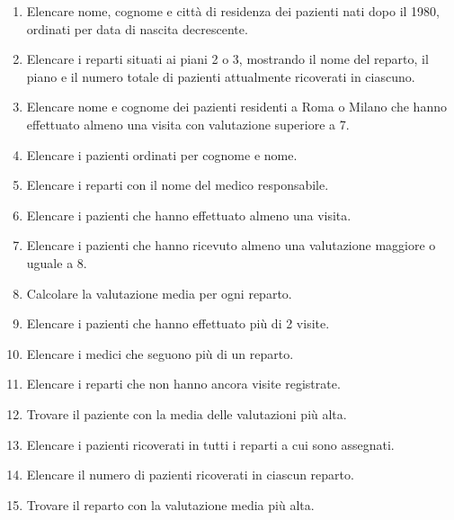 \documentclass[a4paper,12pt]{article}
\begin{document}
	\begin{enumerate}
		
\item Elencare nome, cognome e città di residenza dei pazienti
nati dopo il 1980, ordinati per data di nascita decrescente.

\item Elencare i reparti situati ai piani 2 o 3, mostrando
il nome del reparto, il piano e il numero totale di pazienti
attualmente ricoverati in ciascuno.

\item Elencare nome e cognome dei pazienti residenti a Roma
o Milano che hanno effettuato almeno una visita con
valutazione superiore a 7.
		
		\item Elencare i pazienti ordinati per cognome e nome.
		
		\item Elencare i reparti con il nome del medico responsabile.
		
		\item Elencare i pazienti che hanno effettuato almeno una visita.
		
		\item Elencare i pazienti che hanno ricevuto almeno una valutazione maggiore o uguale a 8.
		
		\item Calcolare la valutazione media per ogni reparto.
		
		\item Elencare i pazienti che hanno effettuato pi\`u di 2 visite.
		
		\item Elencare i medici che seguono pi\`u di un reparto.
		
		\item Elencare i reparti che non hanno ancora visite registrate.
		
		\item Trovare il paziente con la media delle valutazioni pi\`u alta.
		
		\item Elencare i pazienti ricoverati in tutti i reparti a cui sono assegnati.
		
		\item Elencare il numero di pazienti ricoverati in ciascun reparto.
		
		\item Trovare il reparto con la valutazione media pi\`u alta.
		
	\end{enumerate}
	
\end{document}
